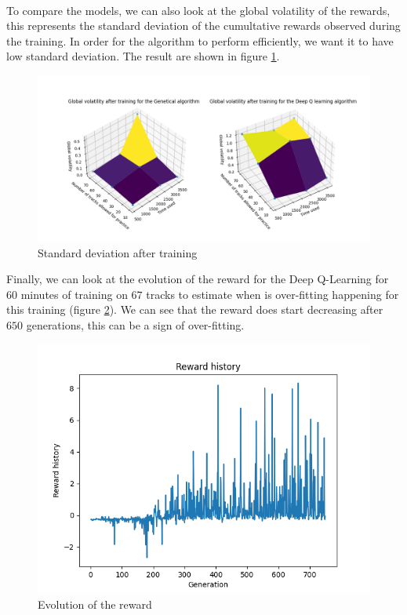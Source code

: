 \documentclass[11pt,a4paper]{article}
\newcounter{fig}
\begin{document}
\\
To compare the models, we can also look at the global volatility of the rewards, this represents the standard deviation of the cumultative rewards observed during the training. In order for the algorithm to perform efficiently, we want it to have low standard deviation. The result are shown in figure \ref{figure:standard deviation}.
        \begin{figure}[ht]
            \centering
            \includegraphics[scale = 0.55]{comparaison3.png}
            \caption{Standard deviation after training}
            \label{figure:standard deviation}
        \end{figure}
Finally, we can look at the evolution of the reward for the Deep Q-Learning for $60$ minutes of training on $67$ tracks to estimate when is over-fitting happening for this training (figure \ref{figure:evolution of the reward}). We can see that the reward does start decreasing after $650$ generations, this can be a sign of over-fitting.
        \begin{figure}[ht]
            \centering
            \includegraphics[width=0.5\linewidth]{graphe_reward.png}
            \caption{Evolution of the reward}
            \label{figure:evolution of the reward}
        \end{figure}
        
        
\end{document}
